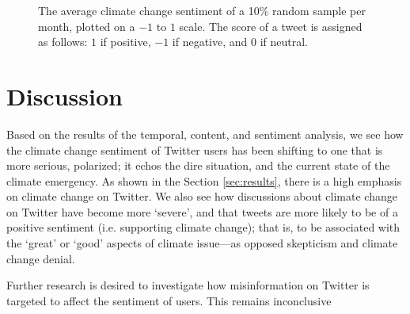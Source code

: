 \documentclass{paper}
\begin{document}
\begin{figure}[!t]
    \centering
    \caption{The average climate change sentiment of a 10\% random sample per month, plotted on a $-1$ to $1$ scale. The score of a tweet is assigned as follows: $1$ if positive, $-1$ if negative, and $0$ if neutral.}
    \label{fig:sentiment_over_time}
\end{figure}

\section{Discussion}
Based on the results of the temporal, content, and sentiment analysis, we see how the climate change sentiment of Twitter users has been shifting to one that is more serious, polarized; it echos the dire situation, and the current state of the climate emergency. As shown in the Section \ref{sec:results}, there is a high emphasis on climate change on Twitter. We also see how discussions about climate change on Twitter have become more `severe', and that tweets are more likely to be of a positive sentiment (i.e. supporting climate change); that is, to be associated with the `great' or `good' aspects of climate issue---as opposed skepticism and climate change denial.

Further research is desired to investigate how misinformation on Twitter is targeted to affect the sentiment of users. This remains inconclusive

\FloatBarrier
\clearpage
\printbibliography[]
\end{document}
